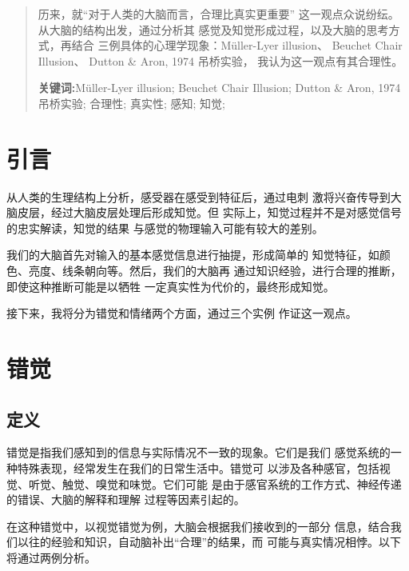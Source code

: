 \documentclass[12pt,a4paper]{ctexart}
\begin{document}
	
	\thispagestyle{empty}
	
	\begin{abstract}
		历来，就“对于人类的大脑而言，合理比真实更重要”
		这一观点众说纷纭。从大脑的结构出发，通过分析其
		感觉及知觉形成过程，以及大脑的思考方式，再结合
		三例具体的心理学现象：Müller-Lyer illusion、
		Beuchet Chair Illusion、
		Dutton \texorpdfstring{\&}{} Aron, 1974 吊桥实验，
		我认为这一观点有其合理性。
		\par\textbf{关键词:}Müller-Lyer illusion; 
		Beuchet Chair Illusion; 
		Dutton \texorpdfstring{\&}{} Aron, 1974 吊桥实验; 
		合理性; 真实性; 感知; 知觉;

	\end{abstract}
	
	
	\newpage
	\section{引言}
	从人类的生理结构上分析，感受器在感受到特征后，通过电刺
	激将兴奋传导到大脑皮层，经过大脑皮层处理后形成知觉。但
	实际上，知觉过程并不是对感觉信号的忠实解读，知觉的结果
	与感觉的物理输入可能有较大的差别。

	我们的大脑首先对输入的基本感觉信息进行抽提，形成简单的
	知觉特征，如颜色、亮度、线条朝向等。然后，我们的大脑再
	通过知识经验，进行合理的推断，即使这种推断可能是以牺牲
	一定真实性为代价的，最终形成知觉。

	接下来，我将分为错觉和情绪两个方面，通过三个实例
	作证这一观点。



	\section{错觉}
	\subsection{定义}
	错觉是指我们感知到的信息与实际情况不一致的现象。它们是我们
	感觉系统的一种特殊表现，经常发生在我们的日常生活中。错觉可
	以涉及各种感官，包括视觉、听觉、触觉、嗅觉和味觉。它们可能
	是由于感官系统的工作方式、神经传递的错误、大脑的解释和理解
	过程等因素引起的。

	在这种错觉中，以视觉错觉为例，大脑会根据我们接收到的一部分
	信息，结合我们以往的经验和知识，自动脑补出“合理”的结果，而
	可能与真实情况相悖。以下将通过两例分析。
\end{document}
